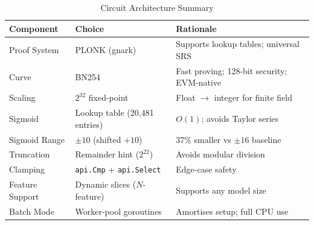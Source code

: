 \begin{table}[H]
\centering
\caption{Circuit Architecture Summary}
\label{tab:circuit_arch}
\begin{tabular}{|l|l|l|}
\hline
\textbf{Component} & \textbf{Choice} & \textbf{Rationale} \\
\hline
Proof System   & PLONK (gnark)    & Supports lookup tables; universal SRS \\
Curve          & BN254            & Fast proving; 128-bit security; EVM-native \\
Scaling        & $2^{32}$ fixed-point & Float $\to$ integer for finite field \\
Sigmoid        & Lookup table (20,481 entries) & $O(1)$; avoids Taylor series \\
Sigmoid Range  & $\pm 10$ (shifted $+10$) & 37\% smaller vs $\pm 16$ baseline \\
Truncation     & Remainder hint ($2^{22}$) & Avoids modular division \\
Clamping       & \texttt{api.Cmp} + \texttt{api.Select} & Edge-case safety \\
Feature Support & Dynamic slices ($N$-feature) & Supports any model size \\
Batch Mode     & Worker-pool goroutines & Amortises setup; full CPU use \\
\hline
\end{tabular}
\end{table}
